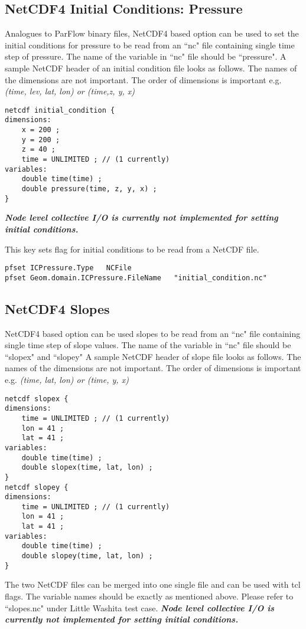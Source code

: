 \subsection{NetCDF4 Initial Conditions: Pressure}
Analogues to ParFlow binary files, NetCDF4 based option can be used to set the initial conditions for pressure to be read from an ``nc" file containing single time step of pressure. The name of the variable in ``nc" file should be ``pressure". A sample NetCDF header of an initial condition file looks as follows. The names of the dimensions are not important. The order of dimensions is important e.g. \textit{(time, lev, lat, lon) or (time,z, y, x)}
\begin{display}\begin{verbatim}
netcdf initial_condition {
dimensions:
	x = 200 ;
	y = 200 ;
	z = 40 ;
	time = UNLIMITED ; // (1 currently)
variables:
	double time(time) ;
	double pressure(time, z, y, x) ;
}
\end{verbatim}\end{display}
\textit{\textbf{Node level collective I/O is currently not implemented for setting initial conditions.}}

{This key sets flag for initial conditions to be read from a NetCDF file.}
\begin{display}\begin{verbatim}
pfset ICPressure.Type   NCFile
pfset Geom.domain.ICPressure.FileName   "initial_condition.nc"
\end{verbatim}\end{display}

\subsection{NetCDF4 Slopes}
NetCDF4 based option can be used slopes to be read from an ``nc" file containing single time step of slope values. The name of the variable in ``nc" file should be ``slopex" and ``slopey" A sample NetCDF header of slope file looks as follows. The names of the dimensions are not important. The order of dimensions is important e.g. \textit{(time, lat, lon) or (time, y, x)}
\begin{display}\begin{verbatim}
netcdf slopex {
dimensions:
	time = UNLIMITED ; // (1 currently)
	lon = 41 ;
	lat = 41 ;
variables:
  	double time(time) ;
	double slopex(time, lat, lon) ;
}
netcdf slopey {
dimensions:
	time = UNLIMITED ; // (1 currently)
	lon = 41 ;
	lat = 41 ;
variables:
	double time(time) ;
	double slopey(time, lat, lon) ;
}
\end{verbatim}\end{display}
The two NetCDF files can be merged into one single file and can be used with tcl flags. The variable names should be exactly as mentioned above. Please refer to ``slopes.nc" under Little Washita test case.
\textit{\textbf{Node level collective I/O is currently not implemented for setting initial conditions.}}

